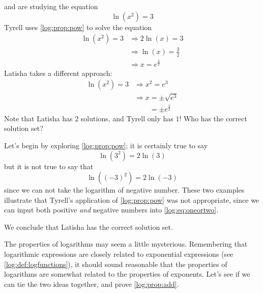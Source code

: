 \begin{pccexample}
	 and  are studying the equation
	\begin{equation}\label{log:eq:oneortwo}
		\ln(x^2)=3
	\end{equation}
	Tyrell uses \cref{log:prop:pow} to solve the equation
	\begin{align*}
		\ln(x^2)=3 & \Rightarrow 2\ln(x)=3          \\ 
		           & \Rightarrow \ln(x)=\frac{3}{2} \\
		           & \Rightarrow x=e^{\frac{3}{2}}  
	\end{align*}
	Latisha takes a different approach:
	\begin{align*}
		\ln(x^2)=3 & \Rightarrow x^2=e^3                                 \\
		           & \Rightarrow x  =\pm\sqrt{e^3}                       \\
		           & \phantom{ {}\Rightarrow x} =\pm e^{\frac{3}{2}} %
	\end{align*}
	Note that Latisha has $2$ solutions, and Tyrell only has $1$! Who has
	the correct solution set?
	\begin{pccsolution}
		Let's begin by exploring \cref{log:prop:pow}; it is certainly true to 
		say
		\[
			\ln(3^2)=2\ln(3)
		\]
		but it is not true to say that
		\[
			\ln( (-3)^2)=2\ln(-3)
		\]
		since we can not take the logarithm of negative number. These two examples
		illustrate that Tyrell's application of \cref{log:prop:pow} was not 
		appropriate, since we can input both positive \emph{and} negative 
		numbers into \cref{log:eq:oneortwo}.
		
		We conclude that Latisha has the correct solution set.
	\end{pccsolution}
\end{pccexample}


The properties of logarithms may seem a little mysterious. Remembering that 
logarithmic expressions are closely related to exponential expressions (see \cref{log:def:logfunctions}), it should 
sound reasonable that the properties of logarithms are somewhat related to the 
properties of exponents. Let's see if we can tie the two ideas together, and prove \cref{log:prop:add}. 

